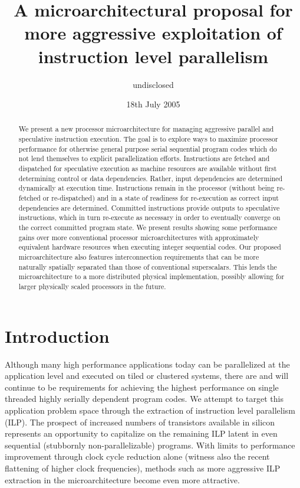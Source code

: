 \documentclass[10pt,dvips]{article}
\begin{document}
%
%
\title{A microarchitectural proposal for more aggressive 
exploitation of instruction level parallelism}
%
%
\author{
undisclosed
}
%
%
\date{18th July 2005}
%
\maketitle
%
%
%
\begin{abstract}
%
We present a new processor microarchitecture for managing aggressive
parallel and speculative instruction execution.  The goal is to explore
ways to maximize processor performance for otherwise general purpose
serial sequential program codes which do not lend themselves to explicit
parallelization efforts.  Instructions are fetched and dispatched for
speculative execution as machine resources are available without first
determining control or data dependencies.  Rather, input dependencies are
determined dynamically at execution time.  Instructions remain in the
processor (without being re-fetched or re-dispatched) and in a state of
readiness for re-execution as correct input dependencies are determined.
Committed instructions provide outputs to speculative instructions, which
in turn re-execute as necessary in order to eventually converge on the
correct committed program state.  We present results showing some
performance gains
over more conventional processor microarchitectures with approximately
equivalent hardware resources when executing integer sequential codes.
Our proposed microarchitecture also features 
interconnection requirements that can be more naturally spatially
separated than those of conventional superscalars.
This lends the microarchitecture to a more
distributed physical implementation, possibly allowing
for larger physically scaled processors in the future.
%
\end{abstract}
%
%
\vspace{-0.15in}
\section{Introduction}
%
Although many high performance applications today
can be parallelized at the application level 
and executed on tiled or clustered systems,
there are and will continue
to be requirements for achieving the highest performance
on single threaded highly serially dependent program codes.
We attempt to target this application problem space
through the extraction of instruction level parallelism (ILP).
The prospect of increased numbers of transistors 
available in silicon represents an opportunity to capitalize on
the remaining ILP latent in even sequential (stubbornly non-parallelizable)
programs.
With limits to performance improvement through clock cycle reduction
alone (witness also the recent flattening of higher clock frequencies),
methods such as more aggressive ILP extraction in the microarchitecture
become even more attractive.
\end{document}

